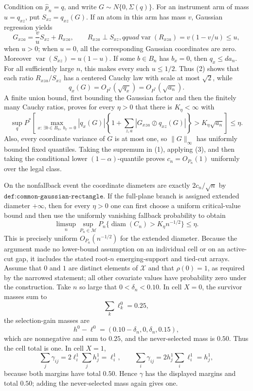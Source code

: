 Condition on \(\widehat p_n=q\), and write \(G\sim N\{0,\Sigma(q)\}\).  For an instrument arm of mass \(u=q_{xz}\), put \(S_{xz}=q_{xz}(G)\).  If an atom in this arm has mass \(v\), Gaussian regression yields
\[
G_{xza}=\frac vuS_{xz}+R_{xza},
\qquad
R_{xza}\perp S_{xz},qquad
\operatorname{var}(R_{xza})=v(1-v/u)\le u,
\tag{2}
\]
when \(u>0\); when \(u=0\), all the corresponding Gaussian coordinates are zero.  Moreover \(\operatorname{var}(S_{xz})=u(1-u)\).  If some \(b\in B_n\) has \(b_x=0\), then \(q_x\le d a_n\).  For all sufficiently large \(n\), this makes every such \(u\le1/2\).  Thus (2) shows that each ratio \(R_{xza}/S_{xz}\) has a centered Cauchy law with scale at most \(\sqrt2\), while
\[
q_x(G)=O_{P^*}(\sqrt{q_x})=O_{P^*}(\sqrt{a_n}).
\]
A finite union bound, first bounding the Gaussian factor and then the finitely many Cauchy ratios, proves for every \(\eta>0\) that there is \(K_\eta<\infty\) with
\[
\sup_q P^*\!\left[
\max_{x:\,\exists b\in B_n,\ b_x=0}
|q_x(G)|\left\{1+\sum_{z,a}|G_{xza}\oslash q_{xz}(G)|\right\}
>K_\eta\sqrt{a_n}\right]\le\eta.
\tag{3}
\]
Also, every coordinate variance of \(G\) is at most one, so \(\|G\|_\infty\) has uniformly bounded fixed quantiles.  Taking the supremum in (1), applying (3), and then taking the conditional lower \((1-\alpha)\)-quantile proves \(c_n=O_{P_n}(1)\) uniformly over the legal class.

On the nonfallback event the coordinate diameters are exactly \(2c_n/\sqrt n\) by \(\texttt{def:common-gaussian-rectangle}\).  If the full-plane branch is assigned extended diameter \(+\infty\), then for every \(\eta>0\) one can first choose a uniform critical-value bound and then use the uniformly vanishing fallback probability to obtain
\[
\limsup_n\sup_{P_n\in\mathcal M}
P_n\{\operatorname{diam}(C_n)>K_\eta n^{-1/2}\}\le\eta.
\]
This is precisely uniform \(O_{P_n}(n^{-1/2})\) for the extended diameter.  Because the argument made no lower-bound assumption on an individual cell or on an active-cut gap, it includes the stated root-\(n\) emerging-support and tied-cut arrays.
Assume that \(0\) and \(1\) are distinct elements of \(\mathcal X\) and that \(\rho(0)=1\), as required by the narrowed statement; all other covariate values have probability zero under the construction.  Take \(n\) so large that \(0<\delta_n<0.10\).  In cell \(X=0\), the survivor masses sum to
\[
\sum_k\ell_k^0=0.25,
\]
the selection-gain masses are
\[
h^0-\ell^0=(0.10-\delta_n,0,\delta_n,0.15),
\]
which are nonnegative and sum to \(0.25\), and the never-selected mass is \(0.50\).  Thus the cell total is one.  In cell \(X=1\),
\[
\sum_j\gamma_{ij}=2\ell_i^1\sum_jh_j^1=\ell_i^1,
\qquad
\sum_i\gamma_{ij}=2h_j^1\sum_i\ell_i^1=h_j^1,
\]
because both margins have total \(0.50\).  Hence \(\gamma\) has the displayed margins and total \(0.50\); adding the never-selected mass again gives one.

